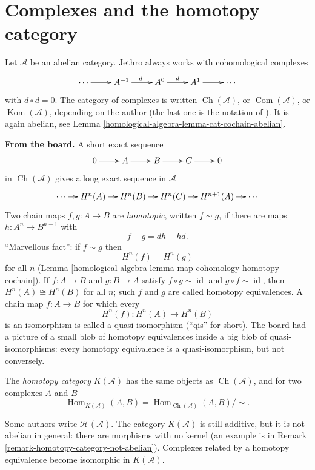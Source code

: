 \section{Complexes and the homotopy category}
\label{section-complexes-homotopy-category}

\noindent
Let $\mathcal{A}$ be an abelian category.
Jethro always works with cohomological
complexes
$$
\xymatrix{
\cdots\ar[r]
&A^{-1}\ar[r]^{d}
&A^{0}\ar[r]^{d}
&A^{1}\ar[r]
&\cdots
}
$$
with $d\circ d=0$. The category of
complexes is written
$\operatorname{Ch}(\mathcal{A})$, or
$\operatorname{Com}(\mathcal{A})$, or
$\operatorname{Kom}(\mathcal{A})$,
depending on the author
(the last one is the notation of
\cite{huybrechts-fm}). It is again
abelian, see Lemma
\ref{homological-algebra-lemma-cat-cochain-abelian}.

\medskip\noindent
{\bf From the board.} A short exact
sequence
$$
\xymatrix{
0\ar[r]&A\ar[r]&B\ar[r]&C\ar[r]&0
}
$$
in $\operatorname{Ch}(\mathcal{A})$ gives
a long exact sequence in $\mathcal{A}$
$$
\xymatrix@C=1.1em{
\cdots\ar[r]
&H^n(A)\ar[r]
&H^n(B)\ar[r]
&H^n(C)\ar[r]
&H^{n+1}(A)\ar[r]
&\cdots
}
$$
Two chain maps $f,g:A\to B$ are
{\it homotopic}, written $f\sim g$, if
there are maps $h:A^n\to B^{n-1}$ with
$$
f-g=dh+hd.
$$
``Marvellous fact'': if $f\sim g$ then
$$
H^n(f)=H^n(g)
$$
for all $n$ (Lemma
\ref{homological-algebra-lemma-map-cohomology-homotopy-cochain}).
If $f:A\to B$ and $g:B\to A$ satisfy
$f\circ g\sim\operatorname{id}$ and
$g\circ f\sim\operatorname{id}$, then
$H^n(A)\cong H^n(B)$ for all $n$; such
$f$ and $g$ are called homotopy
equivalences. A chain map $f:A\to B$ for
which every
$$
H^n(f):H^n(A)\to H^n(B)
$$
is an isomorphism is called a
quasi-isomorphism (``qis'' for short).
The board had a picture of a small
blob of homotopy equivalences inside a
big blob of quasi-isomorphisms: every
homotopy equivalence is a
quasi-isomorphism, but not conversely.

\begin{definition}
\label{definition-homotopy-category}
The {\it homotopy category}
$K(\mathcal{A})$ has the same objects as
$\operatorname{Ch}(\mathcal{A})$, and
for two complexes $A$ and $B$
$$
\operatorname{Hom}_{K(\mathcal{A})}(A,B)
=
\operatorname{Hom}_{
\operatorname{Ch}(\mathcal{A})}(A,B)
/\sim.
$$
\end{definition}

\noindent
Some authors write
$\mathcal{H}(\mathcal{A})$. The
category $K(\mathcal{A})$ is still
additive, but it is not abelian in
general: there are morphisms with no
kernel (an example is in Remark
\ref{remark-homotopy-category-not-abelian}).
Complexes related by a homotopy
equivalence become isomorphic in
$K(\mathcal{A})$.

